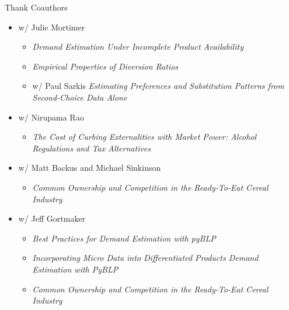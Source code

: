 \begin{frame}{Thank Coauthors}
\begin{itemize}
    \item w/ Julie Mortimer

    \begin{itemize}
        \item \textit{Demand Estimation Under Incomplete Product Availability}
        \item \textit {Empirical Properties of Diversion Ratios}
        \item w/ Paul Sarkis \textit{Estimating Preferences and Substitution Patterns from Second-Choice Data Alone }
    \end{itemize}

    \item w/ Nirupama Rao

    \begin{itemize}
        \item \textit{The Cost of Curbing Externalities with Market Power: Alcohol Regulations and Tax Alternatives}
    \end{itemize}

    \item w/ Matt Backus and Michael Sinkinson

    \begin{itemize}
        \item \textit{Common Ownership and Competition in the Ready-To-Eat Cereal Industry}
    \end{itemize}

    \item w/ Jeff Gortmaker 
    \begin{itemize}
        \item \textit{Best Practices for Demand Estimation with pyBLP}
        \item \textit{Incorporating Micro Data into Differentiated Products Demand Estimation with PyBLP}
    \end{itemize}

    \begin{itemize}
        \item \textit{Common Ownership and Competition in the Ready-To-Eat Cereal Industry}
    \end{itemize}


\end{itemize}
\end{frame}

